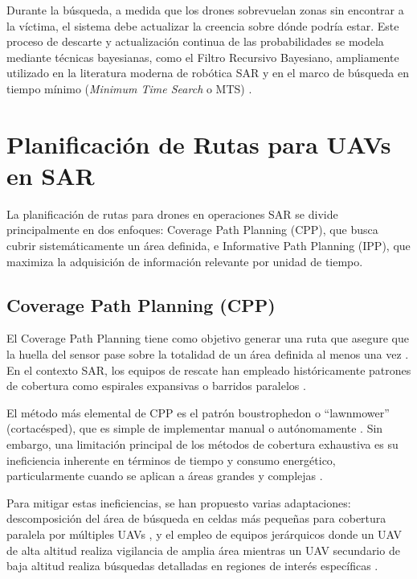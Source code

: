 Durante la búsqueda, a medida que los drones sobrevuelan zonas sin encontrar a la víctima, el sistema debe actualizar la creencia sobre dónde podría estar. Este proceso de descarte y actualización continua de las probabilidades se modela mediante técnicas bayesianas, como el Filtro Recursivo Bayesiano, ampliamente utilizado en la literatura moderna de robótica SAR y en el marco de búsqueda en tiempo mínimo (\textit{Minimum Time Search} o MTS) \cite{MTS_c1, lanillos-bayesian, carabaza_ingles, tesis_carabaza}.

\section{Planificación de Rutas para UAVs en SAR}

La planificación de rutas para drones en operaciones SAR se divide principalmente en dos enfoques: Coverage Path Planning (CPP), que busca cubrir sistemáticamente un área definida, e Informative Path Planning (IPP), que maximiza la adquisición de información relevante por unidad de tiempo.

\subsection{Coverage Path Planning (CPP)}

El Coverage Path Planning tiene como objetivo generar una ruta que asegure que la huella del sensor pase sobre la totalidad de un área definida al menos una vez \cite{galceran2013}. En el contexto SAR, los equipos de rescate han empleado históricamente patrones de cobertura como espirales expansivas o barridos paralelos \cite{foo2012, hart2023}.

El método más elemental de CPP es el patrón boustrophedon o ``lawnmower'' (cortacésped), que es simple de implementar manual o autónomamente \cite{bahnemann2019}. Sin embargo, una limitación principal de los métodos de cobertura exhaustiva es su ineficiencia inherente en términos de tiempo y consumo energético, particularmente cuando se aplican a áreas grandes y complejas \cite{choset2001}.

Para mitigar estas ineficiencias, se han propuesto varias adaptaciones: descomposición del área de búsqueda en celdas más pequeñas para cobertura paralela por múltiples UAVs \cite{nielsen2019, dong2020}, y el empleo de equipos jerárquicos donde un UAV de alta altitud realiza vigilancia de amplia área mientras un UAV secundario de baja altitud realiza búsquedas detalladas en regiones de interés específicas \cite{hacho2018}.

